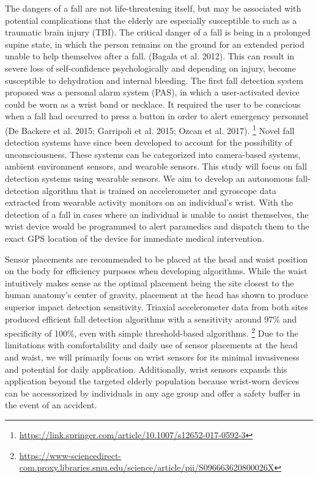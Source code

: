\documentclass{llncs}
\begin{document}
	The dangers of a fall are not life-threatening itself, but may be associated with potential complications that the elderly are especially susceptible to such as a traumatic brain injury (TBI). The critical danger of a fall is being in a prolonged supine state, in which the person remains on the ground for an extended period unable to help themselves after a fall. (Bagala et al. 2012).  This can result in severe loss of self-confidence psychologically and depending on injury, become susceptible to dehydration and internal bleeding.  The first fall detection system proposed was a personal alarm system (PAS), in which a user-activated device could be worn as a wrist band or necklace. It required the user to be conscious when a fall had occurred to press a button in order to alert emergency personnel (De Backere et al. 2015; Garripoli et al. 2015; Ozcan et al. 2017). \footnote{\url{https://link.springer.com/article/10.1007/s12652-017-0592-3}} Novel fall detection systems have since been developed to account for the possibility of unconsciousness. These systems can be categorized into camera-based systems, ambient environment sensors, and wearable sensors. This study will focus on fall detection systems using wearable sensors. We aim to develop an autonomous fall-detection algorithm that is trained on accelerometer and gyroscope data extracted from wearable activity monitors on an individual's wrist. With the detection of a fall in cases where an individual is unable to assist themselves, the wrist device would be programmed to alert paramedics and dispatch them to the exact GPS location of the device for immediate medical intervention. 
	
	Sensor placements are recommended to be placed at the head and waist position on the body for efficiency purposes when developing algorithms. While the waist intuitively makes sense as the optimal placement being the site closest to the human anatomy's center of gravity, placement at the head has shown to produce superior impact detection sensitivity. Triaxial accelerometer data from both sites produced efficient fall detection algorithms with a sensitivity around 97\% and specificity of 100\%, even with simple threshold-based algorithms. \footnote{\url{https://www-sciencedirect-com.proxy.libraries.smu.edu/science/article/pii/S096663620800026X}} Due to the limitations with comfortability and daily use of sensor placements at the head and waist, we will primarily focus on wrist sensors for its minimal invasiveness and potential for daily application. Additionally, wrist sensors expands this application beyond the targeted elderly population because wrist-worn devices can be accessorized by individuals in any age group and offer a safety buffer in the event of an accident. 
	
\end{document}
